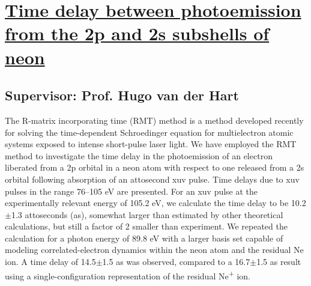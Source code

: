 \section{\href{https://doi.org/10.1103/PhysRevA.84.061404}{Time delay between photoemission from the 2p and 2s subshells of neon}}

\subsection*{Supervisor: Prof. Hugo van der Hart}


The R-matrix incorporating time (RMT) method is a method developed recently 
for solving the time-dependent Schroedinger equation for multielectron atomic 
systems exposed to intense short-pulse laser light. We have employed the RMT 
method to investigate the time delay in the photoemission of an electron 
liberated from a 2p orbital in a neon atom with respect to one released from 
a 2s orbital following absorption of an attosecond xuv pulse. Time delays due 
to xuv pulses in the range 76--105 eV are presented. For an xuv pulse at the 
experimentally relevant energy of 105.2 eV, we calculate the time delay to 
be 10.2$\pm$1.3 attoseconds (as), somewhat larger than estimated by other 
theoretical calculations, but still a factor of 2 smaller than experiment. 
We repeated the calculation for a photon energy of 89.8 eV with a larger 
basis set capable of modeling correlated-electron dynamics within the neon 
atom and the residual Ne ion. A time delay of 14.5$\pm$1.5 as was observed, 
compared to a 16.7$\pm$1.5 as result using a single-configuration 
representation of the residual Ne\textsuperscript{+} ion. 
